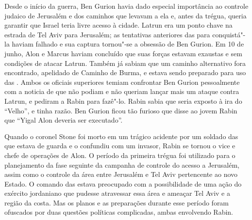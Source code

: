 Desde o início da guerra, Ben Gurion havia dado especial importância ao
controle judaico de Jerusalém e dos caminhos que levavam a ela e, antes
da trégua, queria garantir que Israel teria livre acesso à cidade. Latrun
era um ponto chave na estrada de Tel Aviv para Jerusalém; as tentativas
anteriores das  para conquistá"-la haviam falhado e sua captura
tornou"-se a obsessão de Ben Gurion. Em 10 de junho, Alon e Marcus haviam
concluído que suas forças estavam exaustas e sem condições de
atacar Latrun. Também já sabiam que um caminho alternativo fora
encontrado, apelidado de Caminho de Burma, e estava sendo preparado para
uso das . Ambos os oficiais superiores temiam confrontar Ben Gurion
pessoalmente com a noticia de que não podiam e não queriam lançar mais
um ataque contra Latrun, e pediram a Rabin para fazê"-lo. Rabin sabia que
seria exposto à ira do ``Velho'', e tinha razão. Ben Gurion ficou tão
furioso que disse ao jovem Rabin que ``Yigal Alon deveria ser
executado''.

Quando o coronel Stone foi morto em um trágico acidente por um soldado
das  que estava de guarda e o confundiu com um invasor, Rabin se
tornou o vice e chefe de operações de Alon. O período da primeira trégua
foi utilizado para o planejamento da fase seguinte da campanha de
controle do acesso a Jerusalém, assim como o controle da área entre
Jerusalém e Tel Aviv pertencente ao novo Estado. O comando das 
estava preocupado com a possibilidade de uma ação do exército jordaniano
que pudesse atravessar essa área e ameaçar Tel Aviv e a região da costa.
Mas os planos e as preparações durante esse período foram ofuscados por
duas questões políticas complicadas, ambas envolvendo Rabin.

